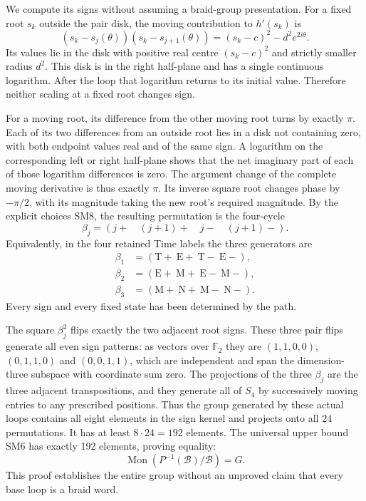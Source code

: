 We compute its signs without assuming a braid-group presentation.
For a fixed root $s_k$ outside the pair disk, the moving contribution
to $h'(s_k)$ is
\[
 (s_k-s_j(\theta))(s_k-s_{j+1}(\theta))
       =(s_k-c)^2-d^2e^{2i\theta}.
\]
Its values lie in the disk with positive real centre $(s_k-c)^2$
and strictly smaller radius $d^2$. This disk is in the right
half-plane and has a single continuous logarithm. After the loop
that logarithm returns to its initial value. Therefore neither
scaling at a fixed root changes sign.

For a moving root, its difference from the other moving root turns
by exactly $\pi$. Each of its two differences from an outside
root lies in a disk not containing zero, with both endpoint values
real and of the same sign. A logarithm on the corresponding left
or right half-plane shows that the net imaginary part of each of
those logarithm differences is zero. The argument change of the
complete moving derivative is thus exactly $\pi$. Its inverse
square root changes phase by $-\pi/2$, with its magnitude taking
the new root's required magnitude. By the explicit choices SM8,
the resulting permutation is the four-cycle
\begin{equation}
 \beta_j=(j+\quad(j+1)+\quad j-\quad(j+1)-).
 \tag{SM10}
\end{equation}
Equivalently, in the four retained Time labels the three generators
are
\begin{equation}
 \begin{split}
 \beta_1&=(\mathrm T+\ \mathrm E+\ \mathrm T-\ \mathrm E-),\\
 \beta_2&=(\mathrm E+\ \mathrm M+\ \mathrm E-\ \mathrm M-),\\
 \beta_3&=(\mathrm M+\ \mathrm N+\ \mathrm M-\ \mathrm N-).
 \end{split}\tag{SM11}
\end{equation}
Every sign and every fixed state has been determined by the path.

The square $\beta_j^2$ flips exactly the two adjacent root signs.
These three pair flips generate all even sign patterns: as vectors
over $\mathbb F_2$ they are
$(1,1,0,0)$, $(0,1,1,0)$ and $(0,0,1,1)$, which are independent
and span the dimension-three subspace with coordinate sum zero.
The projections of the three $\beta_j$ are the three adjacent
transpositions, and they generate all of $S_4$ by successively
moving entries to any prescribed positions. Thus the group
generated by these actual loops contains all eight elements in
the sign kernel and projects onto all 24 permutations. It has
at least $8\cdot24=192$ elements. The universal upper bound SM6
has exactly 192 elements, proving equality:
\begin{equation}
 \boxed{\operatorname{Mon}(P^{-1}(\mathcal B)/\mathcal B)=G.}
 \tag{SM12}
\end{equation}
This proof establishes the entire group without an unproved claim
that every base loop is a braid word.

